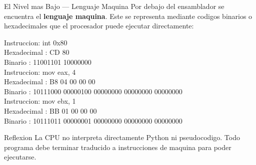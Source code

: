 \documentclass[10pt, aspectratio=169]{beamer}
\newcommand{\codigobox}[1]{
	\begin{block}{}
		\colorbox{codigofondo}{
			\begin{minipage}{0.96\textwidth}
				\ttfamily\scriptsize
				#1
			\end{minipage}
		}
	\end{block}
}
\begin{document}
	\begin{frame}{El Nivel mas Bajo --- Lenguaje Maquina}
		Por debajo del ensamblador se encuentra el \textbf{lenguaje maquina}. Este se
		representa mediante codigos binarios o hexadecimales que el procesador puede
		ejecutar directamente:
		
		\vspace{0.2cm}
		
		\codigobox{
			Instruccion: int 0x80\\
			Hexadecimal : CD 80\\
			Binario     : 11001101 10000000\\[0.15cm]
			Instruccion: mov eax, 4\\
			Hexadecimal : B8 04 00 00 00\\
			Binario     : 10111000 00000100 00000000 00000000 00000000\\[0.15cm]
			Instruccion: mov ebx, 1\\
			Hexadecimal : BB 01 00 00 00\\
			Binario     : 10111011 00000001 00000000 00000000 00000000
		}
		
		\vspace{0.1cm}
		\begin{block}{Reflexion}
			La CPU no interpreta directamente Python ni pseudocodigo. Todo programa debe
			terminar traducido a instrucciones de maquina para poder ejecutarse.
		\end{block}
	\end{frame}
	
\end{document}
